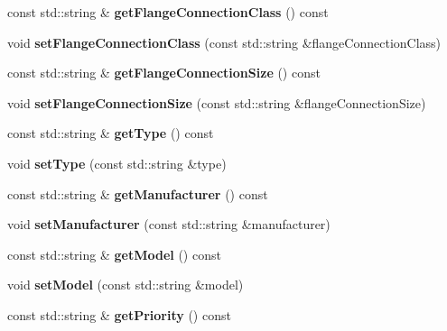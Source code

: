 \begin{DoxyCompactItemize}
\mbox{\label{class_pump_data_a7d6ebf08d7643be4ed47825c02f90d95}} 
const std\+::string \& {\bfseries get\+Flange\+Connection\+Class} () const
\item 
\mbox{\label{class_pump_data_a70d000d403967dbd7f0808e5f9454967}} 
void {\bfseries set\+Flange\+Connection\+Class} (const std\+::string \&flange\+Connection\+Class)
\item 
\mbox{\label{class_pump_data_aebd26ff90305d6de2894d274e7d5d67b}} 
const std\+::string \& {\bfseries get\+Flange\+Connection\+Size} () const
\item 
\mbox{\label{class_pump_data_a4e3c5e1307a5a94f26ecd822c7273a95}} 
void {\bfseries set\+Flange\+Connection\+Size} (const std\+::string \&flange\+Connection\+Size)
\item 
\mbox{\label{class_pump_data_a80c4ec64e16f60a24756f1e9c152e1f5}} 
const std\+::string \& {\bfseries get\+Type} () const
\item 
\mbox{\label{class_pump_data_a147302e2849bfac57d08c3e98c62e2fa}} 
void {\bfseries set\+Type} (const std\+::string \&type)
\item 
\mbox{\label{class_pump_data_a8961d33d0fd5753cbd468f0a5277d48e}} 
const std\+::string \& {\bfseries get\+Manufacturer} () const
\item 
\mbox{\label{class_pump_data_a8d41cfbffb88ed36f2d069edb5ae5e65}} 
void {\bfseries set\+Manufacturer} (const std\+::string \&manufacturer)
\item 
\mbox{\label{class_pump_data_a5f02db99c8c2cb8b95f3ab5fba103482}} 
const std\+::string \& {\bfseries get\+Model} () const
\item 
\mbox{\label{class_pump_data_a9ab5980c78d786c363e583ce371c297a}} 
void {\bfseries set\+Model} (const std\+::string \&model)
\item 
\mbox{\label{class_pump_data_ac59296edb5f251e177029f3dbd65cb57}} 
const std\+::string \& {\bfseries get\+Priority} () const

\end{DoxyCompactItemize}
